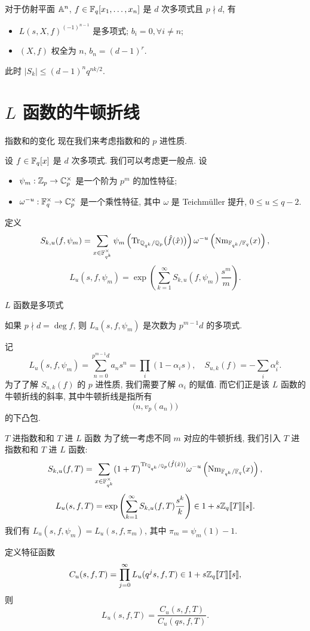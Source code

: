 \documentclass[aspectratio=169,handout]{ctexbeamer}
\newcommand\ldb{\llbracket}
\newcommand\rdb{\rrbracket}
\begin{document}
\begin{frame}
\begin{example}[Serre1977]
对于仿射平面 ${\mathbb{A}}^n$, $f\in{\mathbb{F}}_q[x_1,\dots,x_n]$ 是 $d$ 次多项式且 $p\nmid d$, 有
\begin{itemize}
	\item $L(s,X,f)^{(-1)^{n-1}}$ 是多项式; $b_i=0,\forall i\neq n$;
	\item $(X,f)$ 权全为 $n$, $b_n=(d-1)^r$.
\end{itemize}
此时 $|S_k|\le (d-1)^nq^{nk/2}$.
\end{example}
\end{frame}
	

\section{$L$ 函数的牛顿折线}


\begin{frame}{指数和的变化}
现在我们来考虑指数和的 $p$ 进性质.

设 $f\in{\mathbb{F}}_q[x]$ 是 $d$ 次多项式.
我们可以考虑更一般点. 设
\begin{itemize}
\item $\psi_m:{\mathbb{Z}}_p\to{\mathbb{C}}_p^\times$ 是一个阶为 $p^m$ 的加性特征;
\item $\omega^{-u}:{\mathbb{F}}_q^\times\to{\mathbb{C}}_p^\times$ 是一个乘性特征, 其中 $\omega$ 是 Teichm\"uller 提升, $0\le u\le q-2$.
\end{itemize}
定义
	\[
		S_{k,u}(f,\psi_m)=\sum_{x\in{\mathbb{F}}_{q^k}^\times}\psi_m\left({\mathrm{Tr}}_{{\mathbb{Q}}_{q^k}/{\mathbb{Q}}_p}\bigl(\hat f(\hat x)\bigr)\right)\omega^{-u}\left({\mathrm{Nm}}_{{\mathbb{F}}_{q^k}/{\mathbb{F}}_q}(x)\right),
	\]
	\[
		L_u(s,f,\psi_m)=\exp\left(\sum_{k=1}^\infty S_{k,u}(f,\psi_m)\frac{s^m}m\right).
	\]
\end{frame}

\begin{frame}{$L$ 函数是多项式}
\begin{theorem}
如果 $p\nmid d=\deg f$, 则 $L_u(s,f,\psi_m)$ 是次数为 $p^{m-1}d$ 的多项式.
\end{theorem} 

记
	\[L_u(s,f,\psi_m)=\sum_{n=0}^{p^{m-1}d} a_n s^n=\prod_i(1-\alpha_i s),
	\quad S_{u,k}(f)=-\sum_i \alpha_i^k.\]
为了了解 $S_{u,k}(f)$ 的 $p$ 进性质, 我们需要了解 $\alpha_i$ 的赋值.
而它们正是该 $L$ 函数的牛顿折线的斜率, 其中牛顿折线是指所有
	\[\bigl(n,v_p(a_n)\bigr)\]
的下凸包.
\end{frame}


\begin{frame}{$T$ 进指数和和 $T$ 进 $L$ 函数}
为了统一考虑不同 $m$ 对应的牛顿折线, 我们引入 $T$ 进指数和和 $T$ 进 $L$ 函数:
	\[	S_{k,u}(f,T)=\sum_{x\in{\mathbb{F}}_{q^k}^\times}(1+T)^{{\mathrm{Tr}}_{{\mathbb{Q}}_{q^k}/{\mathbb{Q}}_p}(\hat f(\hat x))}\omega^{-u}\left({\mathrm{Nm}}_{{\mathbb{F}}_{q^k}/{\mathbb{F}}_q}(x)\right), \]
	\[
		L_u(s,f,T)=\exp\left(\sum_{k=1}^\infty S_{k,u}(f,T)\frac{s^k}{k}\right)\in 1+s\BZ_q\ldb T\rdb\ldb s\rdb.
	\]
我们有 $L_u(s,f,\psi_m)=L_u(s,f,\pi_m)$, 其中 $\pi_m=\psi_m(1)-1$.

定义特征函数
	\[C_u(s,f,T)=\prod_{j=0}^\infty L_u(q^j s,f,T)\in 1+s\BZ_q\ldb T\rdb\ldb s\rdb,\]
则
	\[	L_u(s,f,T)=\frac{C_u(s,f,T)}{C_u(qs,f,T)}.\]
\end{frame}
\end{document}
